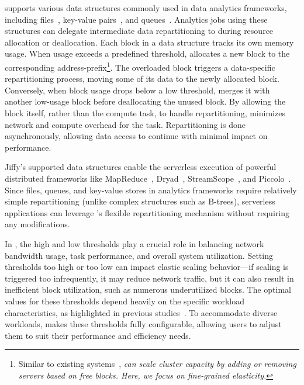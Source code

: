 \jiffy supports various data structures commonly used in data analytics frameworks, including files~\cite{sparkonlambda, athena, aurora, azuresqldw, snowset}, key-value pairs~\cite{pywren, locus, starling, gg, cirrus, cloudburst, pocket}, and queues~\cite{flint, excamera}. Analytics jobs using these structures can delegate intermediate data repartitioning to \jiffy during resource allocation or deallocation. Each block in a \jiffy data structure tracks its own memory usage. When usage exceeds a predefined threshold, \jiffy allocates a new block to the corresponding address-prefix\footnote{Similar to existing systems~\cite{elasticache, redis, ramcloud, pocket}, \sl can scale cluster capacity by adding or removing servers based on free blocks. Here, we focus on fine-grained elasticity.}. The overloaded block triggers a data-specific repartitioning process, moving some of its data to the newly allocated block. Conversely, when block usage drops below a low threshold, \jiffy merges it with another low-usage block before deallocating the unused block. By allowing the block itself, rather than the compute task, to handle repartitioning, \jiffy minimizes network and compute overhead for the task. Repartitioning is done asynchronously, allowing data access to continue with minimal impact on performance.

Jiffy’s supported data structures enable the serverless execution of powerful distributed frameworks like MapReduce~\cite{mapreduce,spark}, Dryad~\cite{dryad}, StreamScope~\cite{streamscope}, and Piccolo~\cite{piccolo}. Since files, queues, and key-value stores in analytics frameworks require relatively simple repartitioning (unlike complex structures such as B-trees), serverless applications can leverage \jiffy’s flexible repartitioning mechanism without requiring any modifications.


 In \jiffy, the high and low thresholds play a crucial role in balancing network bandwidth usage, task performance, and overall system utilization. Setting thresholds too high or too low can impact elastic scaling behavior—if scaling is triggered too infrequently, it may reduce network traffic, but it can also result in inefficient block utilization, such as numerous underutilized blocks. The optimal values for these thresholds depend heavily on the specific workload characteristics, as highlighted in previous studies~\cite{mongo-shard, ceph-shard}. To accommodate diverse workloads, \jiffy makes these thresholds fully configurable, allowing users to adjust them to suit their performance and efficiency needs.


